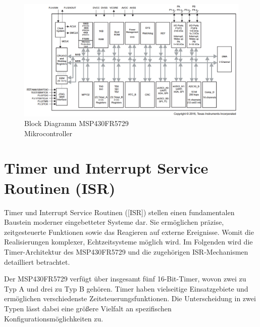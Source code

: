 \begin{figure}[h!]
	\centering
	\includegraphics[width=1.0\textwidth]{../Bilder/FunctionalBlockDiagram_MSP430FR5729.png}
	\caption{Block Diagramm MSP430FR5729\\Mikrocontroller {}}
	\label{fig:BlockDiagramm_msp430}
\end{figure}

\section{Timer und Interrupt Service Routinen (ISR)}
\label{sec:TIMER&ISR}

Timer und Interrupt Service Routinen ([ISR]) stellen einen fundamentalen Baustein moderner eingebetteter Systeme dar. Sie erm\"oglichen pr\"azise, zeitgesteuerte Funktionen sowie das Reagieren auf externe Ereignisse. Womit die Realisierungen komplexer, Echtzeitsysteme m\"oglich wird. Im Folgenden wird die Timer-Architektur des MSP430FR5729 und die zugeh\"origen ISR-Mechanismen detailliert betrachtet.

Der MSP430FR5729 verf\"ugt \"uber insgesamt f\"unf 16-Bit-Timer, wovon zwei zu Typ A und drei zu Typ B geh\"oren. Timer haben vielseitige Einsatzgebiete und erm\"oglichen verschiedenste Zeitsteuerungsfunktionen. Die Unterscheidung in zwei Typen l\"asst dabei eine gr\"o{\ss}ere Vielfalt an spezifischen Konfigurationsm\"oglichkeiten zu.

